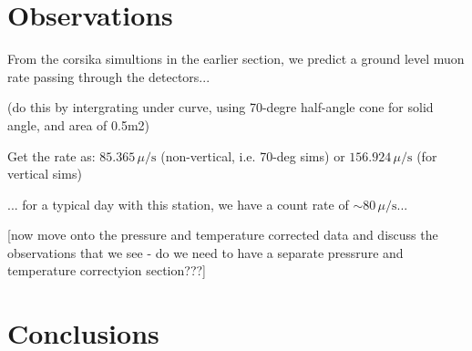 \section{Observations}\label{sec:HS_14008_observations}

From the \gls{corsika} simultions in the earlier section, we predict a ground level muon rate passing through the detectors...

(do this by intergrating under curve, using 70-degre half-angle cone for solid angle, and area of 0.5m2)

Get the rate as: $85.365 \, \mu/\mathrm{s}$ (non-vertical, i.e. 70-deg sims) or $156.924 \, \mu/\mathrm{s}$ (for vertical sims)

... for a typical day with this station, we have a count rate of $\sim 80 \, \mu/\mathrm{s}$...


[now move onto the pressure and temperature corrected data and discuss the observations that we see - do we need to have a separate pressrure and temperature correctyion section???]

\section{Conclusions}\label{sec:HS_14008_conclusion}
